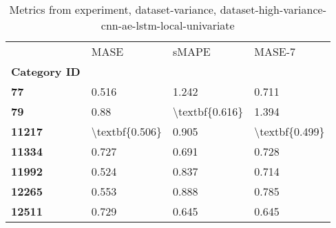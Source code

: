 \begin{table}[h]
\centering
\caption{Metrics from experiment, dataset-variance, dataset-high-variance-cnn-ae-lstm-local-univariate}
\label{table:dataset-high-variance-cnn-ae-lstm-local-univariate-dataset-variance}
\begin{tabular}{llll}
\toprule
{} &            MASE &           sMAPE &          MASE-7 \\
\textbf{Category ID} &                 &                 &                 \\
\midrule
\textbf{77         } &           0.516 &           1.242 &           0.711 \\
\textbf{79         } &            0.88 &  \textbackslash textbf\{0.616\} &           1.394 \\
\textbf{11217      } &  \textbackslash textbf\{0.506\} &           0.905 &  \textbackslash textbf\{0.499\} \\
\textbf{11334      } &           0.727 &           0.691 &           0.728 \\
\textbf{11992      } &           0.524 &           0.837 &           0.714 \\
\textbf{12265      } &           0.553 &           0.888 &           0.785 \\
\textbf{12511      } &           0.729 &           0.645 &           0.645 \\
\bottomrule
\end{tabular}
\end{table}

